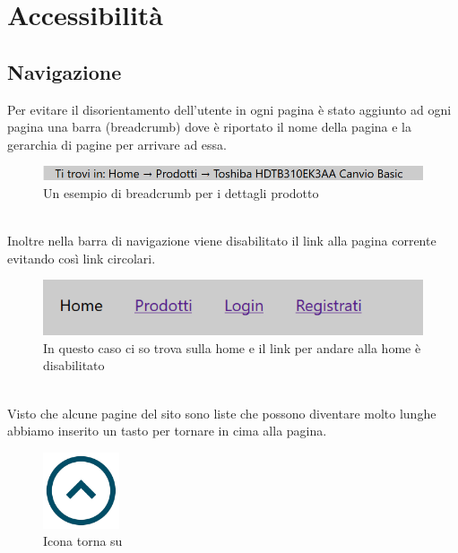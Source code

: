 \section{Accessibilità}
\subsection{Navigazione}
Per evitare il disorientamento dell'utente in ogni pagina è stato aggiunto ad ogni pagina una barra (breadcrumb) dove è riportato il nome della pagina e la gerarchia di pagine per arrivare ad essa.\newline 
\begin{figure}[!h]
	\label{bc} 
	\centering %
	\includegraphics[width=1\textwidth]{immagini/bc.png}
	\caption{Un esempio di breadcrumb per i dettagli prodotto} %
\end{figure} \mbox{} \\
Inoltre nella barra di navigazione viene disabilitato  il link alla pagina corrente evitando così link circolari.
\begin{figure}[h]
	\label{navbar} 
	\centering %
	\includegraphics[width=1\textwidth]{immagini/navbar.png}
	\caption{In questo caso ci so trova sulla home e il link per andare alla home è disabilitato} %
\end{figure} \mbox{} \\
Visto che alcune pagine del sito sono liste che possono diventare molto lunghe abbiamo inserito un tasto per tornare in cima alla pagina.
\begin{figure}[h]
	\label{su} 
	\centering %
	\includegraphics[width=0.2\textwidth]{immagini/su.png}
	\caption{Icona torna su} %
\end{figure} \mbox{} \\


